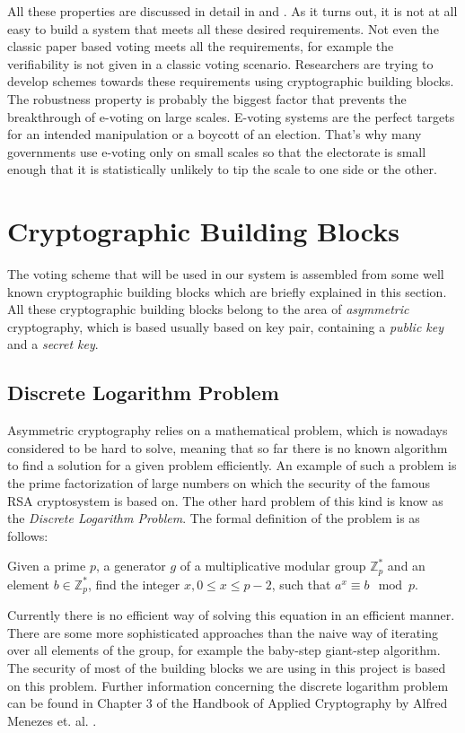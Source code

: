 \documentclass[numbers=noenddot, abstract=on, a4paper, headsepline,
footsepline, oneside, draft=off]{scrreprt}
\begin{document}
All these properties are discussed in detail in \cite{HS11} and \cite{Jonker09}.
As it turns out, it is not at all easy to build a system that meets all these
desired requirements. Not even the classic paper based voting meets all the
requirements, for example the verifiability is not given in a classic voting
scenario. Researchers are trying to develop schemes towards these requirements
using cryptographic building blocks. The robustness property is probably the
biggest factor that prevents the breakthrough of e-voting on large scales.
E-voting systems are the perfect targets for an intended manipulation or a
boycott of an election. That's why many governments use e-voting only on small
scales so that the electorate is small enough that it is statistically unlikely
to tip the scale to one side or the other.

\section{Cryptographic Building Blocks}
\label{sec:buildingblocks}
The voting scheme that will be used in our system is assembled from some well
known cryptographic building blocks which are briefly explained in this section.
All these cryptographic building blocks belong to the area of \emph{asymmetric}
cryptography, which is based usually based on key pair, containing a
\emph{public key} and a \emph{secret key}.

\subsection{Discrete Logarithm Problem}
Asymmetric cryptography relies on a mathematical problem, which is nowadays
considered to be hard to solve, meaning that so far there is no known algorithm
to find a solution for a given problem efficiently. An example of such a problem
is the prime factorization of large numbers on which the security of the famous
RSA cryptosystem \cite{RSA78} is based on. The other hard problem of this kind
is know as the \emph{Discrete Logarithm Problem}. The formal definition of
the problem is as follows: 

Given a prime $p$, a generator $g$ of a multiplicative modular group
$\mathbb{Z}^*_p$ and an element $b \in \mathbb{Z}^*_p$, find the integer
$x,0 \leq x \leq p - 2$, such that $a^x \equiv b \mod p$.

Currently there is no efficient way of solving this equation in an efficient
manner. There are some more sophisticated approaches than the naive way of
iterating over all elements of the group, for example the baby-step giant-step
algorithm. The security of most of the building blocks we are using in this
project is based on this problem. Further information concerning the discrete
logarithm problem can be found in Chapter 3 of the Handbook of Applied
Cryptography by Alfred Menezes et. al. \cite{book:hac}.
\end{document}
